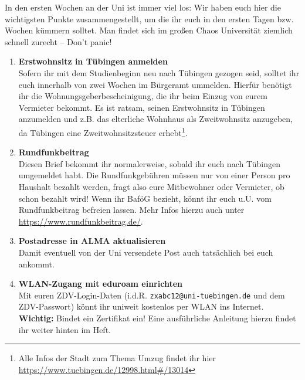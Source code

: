 
In den ersten Wochen an der Uni ist immer viel los: Wir haben euch hier die wichtigsten Punkte zusammengestellt, um die ihr euch in den ersten Tagen bzw. Wochen kümmern solltet. Man findet sich im großen Chaos Universität ziemlich schnell zurecht -- Don't panic!
  
  \begin{enumerate}[label=$\bigcirc$]
  	\item \textbf{Erstwohnsitz in Tübingen anmelden} \\
  		Sofern ihr mit dem Studienbeginn neu nach Tübingen gezogen seid, solltet ihr euch innerhalb von zwei Wochen im Bürgeramt ummelden. Hierfür benötigt ihr die Wohnungsgeberbescheinigung, die ihr beim Einzug von eurem Vermieter bekommt. Es ist ratsam, seinen Erstwohnsitz in Tübingen anzumelden und z.B. das elterliche Wohnhaus als Zweitwohnsitz anzugeben, da Tübingen eine Zweitwohnsitzsteuer erhebt\footnote{Alle Infos der Stadt zum Thema Umzug findet ihr hier \url{https://www.tuebingen.de/12998.html\#/13014}}.
  	
	\item \textbf{Rundfunkbeitrag} \\
		Diesen Brief bekommt ihr normalerweise, sobald ihr euch nach Tübingen umgemeldet habt. Die Rundfunkgebühren müssen nur von einer Person pro Haushalt bezahlt werden, fragt also eure Mitbewohner oder Vermieter, ob schon bezahlt wird! Wenn ihr BaföG bezieht, könnt ihr euch u.U. vom Rundfunkbeitrag befreien lassen. Mehr Infos hierzu auch unter \url{https://www.rundfunkbeitrag.de/}.
  	
  	\item \textbf{Postadresse in ALMA aktualisieren}\\
  		Damit eventuell von der Uni versendete Post auch tatsächlich bei euch ankommt.
  	
  	\item \textbf{WLAN-Zugang mit eduroam einrichten}\\
  		Mit euren ZDV-Login-Daten (i.d.R. \texttt{zxabc12@uni-tuebingen.de} und dem ZDV-Passwort) könnt ihr uniweit kostenlos per WLAN ins Internet. \textbf{Wichtig:} Bindet ein Zertifikat ein! Eine ausführliche Anleitung hierzu findet ihr weiter hinten im Heft. 
  	

\end{enumerate}
